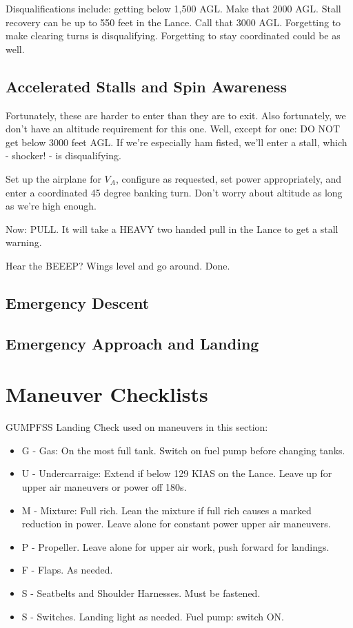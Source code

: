 Disqualifications include: getting below 1,500 AGL. Make that 2000 AGL. Stall recovery can be up to 550 feet in the Lance. Call that 3000 AGL. Forgetting to make clearing turns is disqualifying. Forgetting to stay coordinated could be as well.

\subsection{Accelerated Stalls and Spin Awareness}

Fortunately, these are harder to enter than they are to exit. Also fortunately, we don't have an altitude requirement for this one. Well, except for one: DO NOT get below 3000 feet AGL. If we're especially ham fisted, we'll enter a stall, which - shocker! - is disqualifying.

Set up the airplane for $V_A$, configure as requested, set power appropriately, and enter a coordinated 45 degree banking turn. Don't worry about altitude as long as we're high enough.

Now: PULL. It will take a HEAVY two handed pull in the Lance to get a stall warning.

Hear the BEEEP? Wings level and go around. Done.

\subsection{Emergency Descent}

\subsection{Emergency Approach and Landing}

\section{Maneuver Checklists}

GUMPFSS Landing Check used on maneuvers in this section:
\begin{itemize}
    \item G - Gas: On the most full tank. Switch on fuel pump before changing tanks.
    \item U - Undercarraige: Extend if below 129 KIAS on the Lance. Leave up for upper air maneuvers or power off 180s.
    \item M - Mixture: Full rich. Lean the mixture if full rich causes a marked reduction in power. Leave alone for constant power upper air maneuvers.
    \item P - Propeller. Leave alone for upper air work, push forward for landings.
    \item F - Flaps. As needed.
    \item S - Seatbelts and Shoulder Harnesses. Must be fastened.
    \item S - Switches. Landing light as needed. Fuel pump: switch ON.

\end{itemize}

